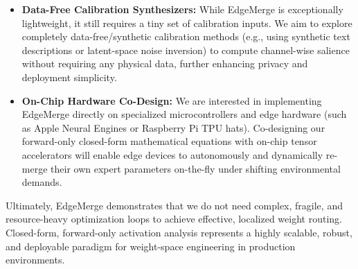 \begin{itemize}
    To concretely illustrate this modality generalizability, we outline a highly feasible proof-of-concept experimental design for text-generative LLMs (e.g., LLaMA-3 8B). Consider the problem of merging a sentiment analysis expert (fine-tuned on IMDb) and a translation expert (fine-tuned on WMT). The intermediate down-projection ($W_{down} \in \mathbb{R}^{d_{model} \times d_{ffn}}$) or gate-projection ($W_{gate} \in \mathbb{R}^{d_{ffn} \times d_{model}}$) layers of SwiGLU FFNs are chosen as our strategic choke-point routing junctions. First, we feed a single batch of 32 unlabeled text prompts from each domain through the pre-trained base model to extract hidden features $X_k$ right before the FFN layer. Second, we compute the channel-wise salience vector $S_k$ based on the activation delta $\Delta H_k = X_k (W^{expert} - W^{base})^T$. Third, we normalize and softmax-gated these vectors across tasks to get channel-specific coefficients $\alpha_k$. Finally, we apply Decoupled Scale Routing (DSR) to compose the weights: keeping standard layers merged at a baseline scale $\lambda_{static}=0.20$, and scaling the gated FFN projection layers with a larger decoupled projection scale $\lambda_{proj} = 1.60$ to offset softmax scaling dampening. This exact mathematical translation of EdgeMerge to the language domain represents a highly promising, zero-gradient, zero-inference-overhead pathway for generative model composition.
    \item \textbf{Data-Free Calibration Synthesizers:} While EdgeMerge is exceptionally lightweight, it still requires a tiny set of calibration inputs. We aim to explore completely data-free/synthetic calibration methods (e.g., using synthetic text descriptions or latent-space noise inversion) to compute channel-wise salience without requiring any physical data, further enhancing privacy and deployment simplicity.
    \item \textbf{On-Chip Hardware Co-Design:} We are interested in implementing EdgeMerge directly on specialized microcontrollers and edge hardware (such as Apple Neural Engines or Raspberry Pi TPU hats). Co-designing our forward-only closed-form mathematical equations with on-chip tensor accelerators will enable edge devices to autonomously and dynamically re-merge their own expert parameters on-the-fly under shifting environmental demands.
\end{itemize}

Ultimately, EdgeMerge demonstrates that we do not need complex, fragile, and resource-heavy optimization loops to achieve effective, localized weight routing. Closed-form, forward-only activation analysis represents a highly scalable, robust, and deployable paradigm for weight-space engineering in production environments.
